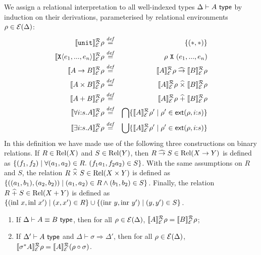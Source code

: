 We assign a relational interpretation to all well-indexed types
$\Delta \vdash A \textsf{ type}$ by induction on their derivations,
parameterised by relational environments $\rho \in
\mathcal{E}(\Delta)$:
\begin{eqnarray*}
  \llbracket \texttt{unit} \rrbracket^{\mathcal{R}}_{\mathcal{E}}{\rho} & \stackrel{\mathit{def}}= & \{(*,*)\} \\
  \llbracket \textup{\texttt{X}}\langle e_1,...,e_n \rangle \rrbracket^{\mathcal{R}}_{\mathcal{E}}{\rho} & \stackrel{\mathit{def}}= & \rho\ {\textup{\texttt{X}}}\ (e_1,...,e_n) \\
  \llbracket A \to B \rrbracket^{\mathcal{R}}_{\mathcal{E}}{\rho} & \stackrel{\mathit{def}}= & \llbracket A \rrbracket^{\mathcal{R}}_{\mathcal{E}}{\rho} \mathrel{\widehat\to} \llbracket B \rrbracket^{\mathcal{R}}_{\mathcal{E}}{\rho} \\
  \llbracket A \times B \rrbracket^{\mathcal{R}}_{\mathcal{E}}{\rho} & \stackrel{\mathit{def}}= & \llbracket A \rrbracket^{\mathcal{R}}_{\mathcal{E}}{\rho} \mathrel{\widehat\times} \llbracket B \rrbracket^{\mathcal{R}}_{\mathcal{E}}{\rho} \\
  \llbracket A + B \rrbracket^{\mathcal{R}}_{\mathcal{E}}{\rho} & \stackrel{\mathit{def}}= & \llbracket A \rrbracket^{\mathcal{R}}_{\mathcal{E}}{\rho} \mathrel{\widehat+} \llbracket B \rrbracket^{\mathcal{R}}_{\mathcal{E}}{\rho} \\
  \llbracket \forall i\mathord:s.A \rrbracket^{\mathcal{R}}_{\mathcal{E}}{\rho} & \stackrel{\mathit{def}}= & \bigcap\{ \llbracket A \rrbracket^{\mathcal{R}}_{\mathcal{E}}{\rho'} \mathrel| \rho' \in \mathsf{ext}(\rho,i\mathord:s) \} \\
  \llbracket \exists i\mathord:s.A \rrbracket^{\mathcal{R}}_{\mathcal{E}}{\rho} & \stackrel{\mathit{def}}= & \bigcup\{ \llbracket A \rrbracket^{\mathcal{R}}_{\mathcal{E}}{\rho'} \mathrel| \rho' \in \mathsf{ext}(\rho,i\mathord:s) \}
\end{eqnarray*}
In this definition we have made use of the following three
constructions on binary relations. If $R \in \mathrm{Rel}(X)$ and $S \in
\mathrm{Rel}(Y)$, then $R \mathrel{\widehat\to} S \in \mathrm{Rel}(X \to Y)$ is defined as $\{
(f_1,f_2) \mathrel| \forall (a_1,a_2) \in R.\ (f_1a_1,f_2a_2) \in S
\}$. With the same assumptions on $R$ and $S$, the relation $R
\mathrel{\widehat\times} S \in \mathrm{Rel}(X \times Y)$ is defined as $\{
((a_1,b_1),(a_2,b_2)) \mathrel| (a_1,a_2) \in R \land (b_1,b_2) \in S
\}$. Finally, the relation $R \mathrel{\widehat+} S \in \mathrm{Rel}(X + Y)$ is defined as
$\{ (\mathrm{inl}\ x, \mathrm{inl}\ x') \mathrel| (x,x') \in R \} \cup
\{ (\mathrm{inr}\ y, \mathrm{inr}\ y') \mathrel| (y,y') \in S \}$.

\begin{lemma}\label{lem:tyeqsubst-relational}
  \begin{enumerate}
  \item If $\Delta \vdash A \equiv B \textsf{ type}$, then for all $\rho \in
    \mathcal{E}(\Delta)$, $\llbracket A \rrbracket^{\mathcal{R}}_{\mathcal{E}}{\rho} =
    \llbracket B \rrbracket^{\mathcal{R}}_{\mathcal{E}}{\rho}$;
  \item If $\Delta' \vdash A \textsf{ type}$ and $\Delta \vdash \sigma
    \Rightarrow \Delta'$, then for all $\rho \in \mathcal{E}(\Delta)$,
    $\llbracket \sigma^*A \rrbracket^{\mathcal{R}}_{\mathcal{E}}{\rho} = \llbracket A \rrbracket^{\mathcal{R}}_{\mathcal{E}}{(}\rho
    \circ \sigma)$.
  \end{enumerate}
\end{lemma}

